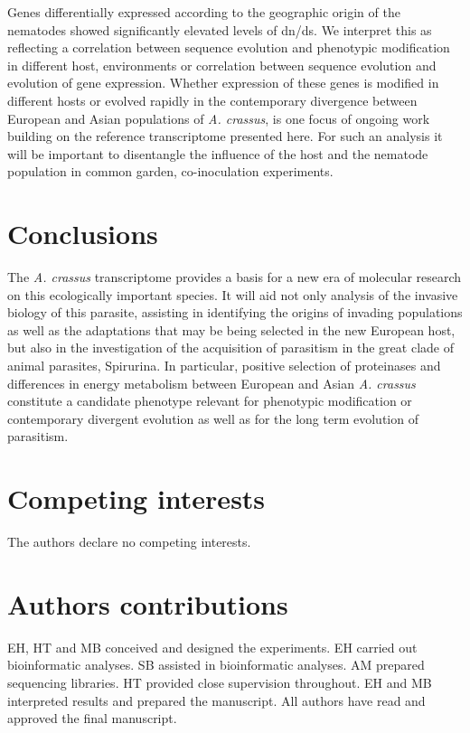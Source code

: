 \documentclass[10pt]{bmc_article}
\newenvironment{bmcformat}{\begin{raggedright}\baselineskip20pt\sloppy\setboolean{publ}{false}}{\end{raggedright}\baselineskip20pt\sloppy}
\begin{document}
\begin{bmcformat}
Genes differentially expressed according to the geographic origin of
the nematodes showed significantly elevated levels of dn/ds. We
interpret this as reflecting a correlation between sequence evolution
and phenotypic modification in different host, environments or
correlation between sequence evolution and evolution of gene
expression. Whether expression of these genes is modified in different
hosts or evolved rapidly in the contemporary divergence between
European and Asian populations of \textit{A. crassus}, is one focus of
ongoing work building on the reference transcriptome presented
here. For such an analysis it will be important to disentangle the
influence of the host and the nematode population in common garden,
co-inoculation experiments.

\section*{Conclusions }

The \textit{A. crassus} transcriptome provides a basis for a new era
of molecular research on this ecologically important species. It will
aid not only analysis of the invasive biology of this parasite,
assisting in identifying the origins of invading populations as well
as the adaptations that may be being selected in the new European
host, but also in the investigation of the acquisition of parasitism
in the great clade of animal parasites, Spirurina. In particular,
positive selection of proteinases and differences in energy metabolism
between European and Asian \textit{A. crassus} constitute a candidate
phenotype relevant for phenotypic modification or contemporary
divergent evolution as well as for the long term evolution of
parasitism.

\section*{Competing interests}
The authors declare no competing interests.

\section*{Authors contributions}

EH, HT and MB conceived and designed the experiments. EH carried out
bioinformatic analyses. SB assisted in bioinformatic analyses. AM
prepared sequencing libraries. HT provided close supervision
throughout. EH and MB interpreted results and prepared the
manuscript. All authors have read and approved the final manuscript.


\end{bmcformat}
\end{document}
